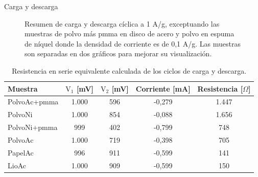 \documentclass{beamer}
\newcommand{\plotscale}{0.4}
\newcommand{\mPolvoAcero}{PolvoAc }
\newcommand{\mPolvoAceroPMMA}{PolvoAc+pmma }
\newcommand{\mPapelAcero}{PapelAc }
\newcommand{\mLiofilizadoAcero}{LioAc }
\newcommand{\mPolvoNiquel}{PolvoNi }
\newcommand{\mPolvoNiquelPMMA}{PolvoNi+pmma }
\begin{document}
\begin{frame}{Carga y descarga}
\begin{figure}[h!]
\begin{subfigure}{0.4\textwidth}
			\end{subfigure}
			\caption[Resumen de carga y descarga cíclica]{Resumen de carga y descarga cíclica a 1 A/g, exceptuando las muestras de polvo más pmma en disco de acero y polvo en espuma de níquel donde la densidad de corriente es de 0,1 A/g. Las muestras son separadas en dos gráficos para mejorar su visualización.}
			\label{fig:resumen_ccd}
		\end{figure}
	\end{frame}

	\begin{frame}
		\begin{table}[h!]
			\centering
			\caption{Resistencia en serie equivalente calculada de los ciclos de carga y descarga.}
			\begin{tabular}{l c c c c}
				Muestra	&	$\mathrm{V_1}$ [mV]	&	$\mathrm{V_2}$ [mV]	&	Corriente [mA]	&	Resistencia [$\Omega$]	\\
				\hline
				\mPolvoAceroPMMA		&	1.000	&	596	&	-0,279	&	1.447	\\
				\mPolvoNiquel			&	1.000	&	854	&	-0,088	&	1.656	\\
				\mPolvoNiquelPMMA		&	999		&	402	&	-0,799	&	748		\\
				\mPolvoAcero			&	1.000	&	719	&	-0,398	&	705		\\
				\mPapelAcero			&	996		&	911	&	-0,599	&	141		\\
				\mLiofilizadoAcero		&	1.000	&	909	&	-0,599	&	150		\\
			\end{tabular}
			\label{tab:esr}
		\end{table}
	\end{frame}
\end{document}
